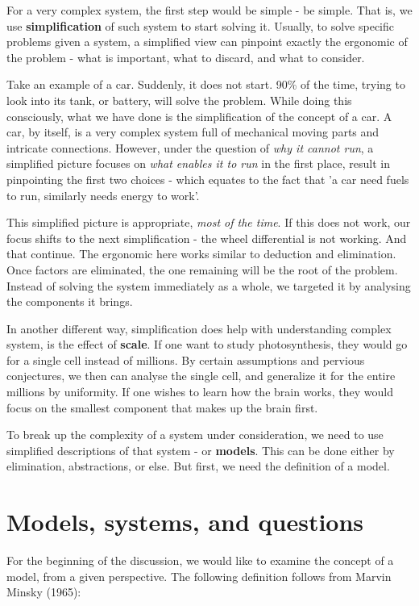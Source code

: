 For a very complex system, the first step would be simple - be simple. That is, we use \textbf{simplification} of such system to start solving it. Usually, to solve specific problems given a system, a simplified view can pinpoint exactly the ergonomic of the problem - what is important, what to discard, and what to consider. 

Take an example of a car. Suddenly, it does not start. 90\% of the time, trying to look into its tank, or battery, will solve the problem. While doing this consciously, what we have done is the simplification of the concept of a car. A car, by itself, is a very complex system full of mechanical moving parts and intricate connections. However, under the question of \textit{why it cannot run}, a simplified picture focuses on \textit{what enables it to run} in the first place, result in pinpointing the first two choices - which equates to the fact that 'a car need fuels to run, similarly needs energy to work'. 

This simplified picture is appropriate, \textit{most of the time}. If this does not work, our focus shifts to the next simplification - the wheel differential is not working. And that continue. The ergonomic here works similar to deduction and elimination. Once factors are eliminated, the one remaining will be the root of the problem. Instead of solving the system immediately as a whole, we targeted it by analysing the components it brings. 

In another different way, simplification does help with understanding complex system, is the effect of \textbf{scale}. If one want to study photosynthesis, they would go for a single cell instead of millions. By certain assumptions and pervious conjectures, we then can analyse the single cell, and generalize it for the entire millions by uniformity. If one wishes to learn how the brain works, they would focus on the smallest component that makes up the brain first. 

To break up the complexity of a system under consideration, we need to use simplified descriptions of that system - or \textbf{models}. This can be done either by elimination, abstractions, or else. But first, we need the definition of a model. 

\section{Models, systems, and questions}
For the beginning of the discussion, we would like to examine the concept of a model, from a given perspective. The following definition follows from Marvin Minsky (1965):  

